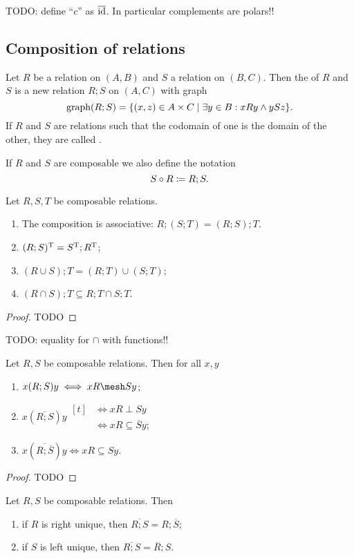 TODO: define ``$c$'' as $\overline{\operatorname{id}}$. In particular complements are polars!!

\subsection{Composition of relations}
\begin{definition}
Let $R$ be a relation on $(A, B)$ and $S$ a relation on $(B, C)$. Then the  of $R$ and $S$ is a new relation $R;S$ on $(A, C)$ with graph
\[ \graph(R;S) = \setbuilder{(x,z)\in A\times C}{\exists y\in B: xRy \land ySz}. \]
If $R$ and $S$ are relations such that the codomain of one is the domain of the other, they are called .

If $R$ and $S$ are composable we also define the notation
\[ S\circ R \coloneqq R;S. \]
\end{definition}
\begin{lemma} \label{relationalComposition}
Let $R,S,T$ be composable relations.
\begin{enumerate}
\item The composition is associative: $R;(S;T) = (R;S);T$.
\item $(R;S)^{\mathrm{T}} = S^{\mathrm{T}} ; R^{\mathrm{T}}$;
\item $(R\cup S);T = (R;T) \cup (S;T)$;
\item $(R\cap S);T \subseteq R;T \cap S;T$.
\end{enumerate}
\end{lemma}
\begin{proof}
TODO
\end{proof}
TODO: equality for $\cap$ with functions!!

\begin{lemma} \label{setOfRelationComposition}
Let $R,S$ be composable relations. Then for all $x,y$
\begin{enumerate}
\item $x(R;S)y \iff xR \mesh Sy$;
\item $x(\overline{R;S})y \begin{aligned}[t]
&\iff xR\perp Sy \\
&\iff xR \subseteq \overline{S}y;
\end{aligned}$
\item $x(\overline{R;\overline{S}})y \iff xR \subseteq Sy$.
\end{enumerate}
\end{lemma}
\begin{proof}
TODO
\end{proof}
\begin{corollary} \label{complementCompositionUniqueness}
Let $R,S$ be composable relations. Then
\begin{enumerate}
\item if $R$ is right unique, then $\overline{R;S} = R;\overline{S}$;
\item if $S$ is left unique, then $\overline{R;S} = \overline{R};S$.
\end{enumerate}
\end{corollary}



